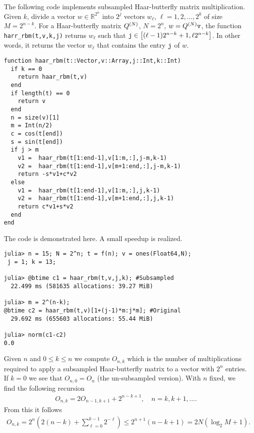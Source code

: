 \documentclass{amsart}
\theoremstyle{definition}
\theoremstyle{remark}
\numberwithin{equation}{section}
\begin{document}
\newcommand{\mtt}[1]{\text{\tt#1}}

The following code implements subsampled Haar-butterfly matrix multiplication.  Given $k$, divide a vector $w \in \mathbb R^{2^n}$ into $2^j$ vectors $w_\ell$, $\ell = 1,2,\ldots,2^k$ of size $M = 2^{n-k}$.  For a Haar-butterfly matrix $Q^{(N)}$, $N = 2^n$, $w = Q\pp{N}\mtt v$, the function {\tt harr\_rbm(t,v,k,j)} returns $w_\ell$ such that $\mtt j \in \left[(\ell-1) 2^{n-k} + 1, \ell 2^{n-k}\right]$.  In other words, it returns the vector $w_\ell$ that contains the entry $\mtt j$ of $w$.

\begin{lstlisting}[linewidth = \linewidth,frame = trBL]
function haar_rbm(t::Vector,v::Array,j::Int,k::Int)
  if k == 0
    return haar_rbm(t,v)
  end
  if length(t) == 0
    return v
  end
  n = size(v)[1]
  m = Int(n/2)
  c = cos(t[end])
  s = sin(t[end])
  if j > m
    v1 =  haar_rbm(t[1:end-1],v[1:m,:],j-m,k-1)
    v2 =  haar_rbm(t[1:end-1],v[m+1:end,:],j-m,k-1)
    return -s*v1+c*v2
  else
    v1 =  haar_rbm(t[1:end-1],v[1:m,:],j,k-1)
    v2 =  haar_rbm(t[1:end-1],v[m+1:end,:],j,k-1)
    return c*v1+s*v2
  end
end
\end{lstlisting}
The code is demonstrated here.  A small speedup is realized.

\begin{lstlisting}[linewidth = \linewidth,frame = trBL]
julia> n = 15; N = 2^n; t = f(n); v = ones(Float64,N);
 j = 1; k = 13;

julia> @btime c1 = haar_rbm(t,v,j,k); #Subsampled
  22.499 ms (581635 allocations: 39.27 MiB)

julia> m = 2^(n-k);
@btime c2 = haar_rbm(t,v)[1+(j-1)*m:j*m]; #Original
  29.692 ms (655603 allocations: 55.44 MiB)

julia> norm(c1-c2)
0.0
\end{lstlisting}

Given $n$ and $0 \leq k \leq n$ we compute $O_{n,k}$ which is the number of multiplications required to apply a subsampled Haar-butterfly matrix to a vector with $2^n$ entries.  If $k = 0$ we see that $O_{n,0} = O_n$ (the un-subsampled version).  With $n$ fixed, we find the following recursion
\begin{align}
  O_{n,k} = 2 O_{n-1,k+1} + 2^{n-k+1}, \quad n = k, k+1, \ldots.
\end{align}
From this it follows
\begin{align}\label{e:iter}
  O_{n,k} = 2^n \left( 2(n-k) + \sum_{\ell = 0}^{k-1} 2^{-\ell} \right) \leq 2^{n+1}(n - k + 1) = 2 N (\log_2 M +1).
\end{align}
\end{document}

